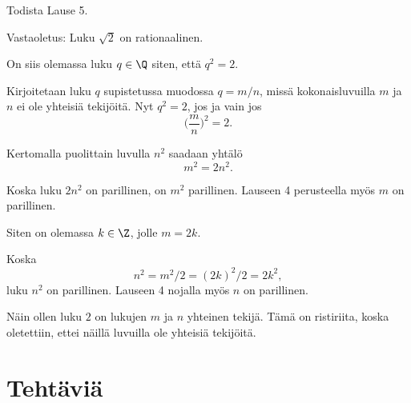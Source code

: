 \begin{esimerkki}
	Todista Lause 5.

	\begin{todistus}
		Vastaoletus: Luku $\sqrt{2}$ on rationaalinen.

		On siis olemassa luku $q\in \Q$ siten, että $q^2=2$.

		Kirjoitetaan luku $q$ supistetussa muodossa $q=m/n$, missä kokonaisluvuilla
		$m$ ja $n$ ei ole yhteisiä tekijöitä. 
		Nyt $q^2=2$, jos ja vain jos
		\[
			\bigg(\frac{m}{n}\bigg)^2=2.
		\]

		Kertomalla puolittain luvulla $n^2$ saadaan yhtälö
		\[
			m^2 = 2n^2.
		\]

		Koska luku $2n^2$ on parillinen, on $m^2$ parillinen. Lauseen 4 perusteella myös $m$ on parillinen.

		Siten on olemassa $k\in \Z$, jolle $m=2k$.

		Koska
		\[
			n^2=m^2/2=(2k)^2/2= 2k^2,
		\]
		luku $n^2$ on parillinen. Lauseen 4 nojalla myös $n$ on parillinen.

		Näin ollen luku $2$ on lukujen $m$ ja $n$ yhteinen tekijä. Tämä on ristiriita,
		koska oletettiin, ettei näillä luvuilla ole yhteisiä tekijöitä.
	\end{todistus}
\end{esimerkki}

\newpage
\section*{Tehtäviä}

